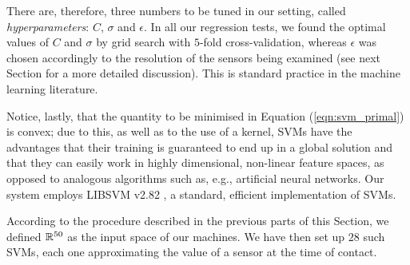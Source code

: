 There are, therefore, three numbers to be tuned in our setting, called
\emph{hyperparameters}: $C$, $\sigma$ and $\epsilon$. In all our
regression tests, we found the optimal values of $C$ and $\sigma$ by
grid search with $5$-fold cross-validation, whereas $\epsilon$ was
chosen accordingly to the resolution of the sensors being examined
(see next Section for a more detailed discussion). This is standard
practice in the machine learning literature.

Notice, lastly, that the quantity to be minimised in Equation
(\ref{eqn:svm_primal}) is convex; due to this, as well as to the use
of a kernel, SVMs have the advantages that their training is
guaranteed to end up in a global solution and that they can easily
work in highly dimensional, non-linear feature spaces, as opposed to
analogous algorithms such as, e.g., artificial neural networks. Our
system employs LIBSVM v2.82 \cite{ChangL01}, a standard, efficient
implementation of SVMs.

According to the procedure described in the previous parts of this
Section, we defined $\mathbb{R}^{50}$ as the input space of our machines. We
have then set up $28$ such SVMs, each one approximating the value of a
sensor at the time of contact.
